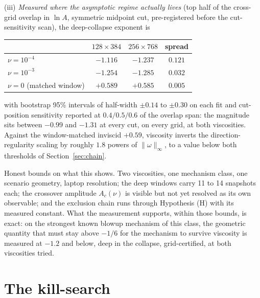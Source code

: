 \documentclass[11pt]{article}
\newcommand{\om}{\omega}
\newcommand{\vinf}{\|\om\|_\infty}
\begin{document}
(iii) \emph{Measured where the asymptotic regime actually lives} (top half
of the cross-grid overlap in $\ln A$, symmetric midpoint cut,
pre-registered before the cut-sensitivity scan), the deep-collapse
exponent is
\begin{center}
\begin{tabular}{lccc}
\toprule
 & $128\times384$ & $256\times768$ & spread \\
\midrule
$\nu=10^{-4}$ & $-1.116$ & $-1.237$ & $0.121$ \\
$\nu=10^{-3}$ & $-1.254$ & $-1.285$ & $0.032$ \\
\midrule
$\nu=0$ (matched window) & $+0.589$ & $+0.585$ & $0.005$ \\
\bottomrule
\end{tabular}
\end{center}
with bootstrap 95\% intervals of half-width $\pm0.14$ to $\pm0.30$ on each fit
and cut-position sensitivity reported at $0.4/0.5/0.6$ of the overlap
span: the magnitude sits between $-0.99$ and $-1.31$ at every cut, on every
grid, at both viscosities. Against the window-matched inviscid $+0.59$,
viscosity inverts the direction-regularity scaling by roughly $1.8$ powers
of $\vinf$, to a value below both thresholds of Section~\ref{sec:chain}.

Honest bounds on what this shows. Two viscosities, one mechanism class,
one scenario geometry, laptop resolution; the deep windows carry 11 to 14
snapshots each; the crossover amplitude $A_c(\nu)$ is visible but not yet
resolved as its own observable; and the exclusion chain runs through
Hypothesis (H) with its measured constant. What the measurement supports,
within those bounds, is exact: on the strongest known blowup mechanism of
this class, the geometric quantity that must stay above $-1/6$ for the
mechanism to survive viscosity is measured at $-1.2$ and below, deep in
the collapse, grid-certified, at both viscosities tried.

\section{The kill-search}\label{sec:kill}
\end{document}
